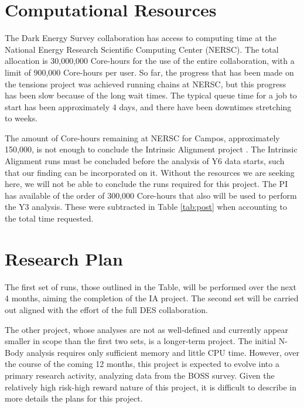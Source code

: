 \documentclass[12pt]{article}
\begin{document}
\begin{small}
\section{Computational Resources}

The Dark Energy Survey collaboration has access to computing time at the National Energy Research Scientific Computing Center (NERSC). The total allocation is 30,000,000 Core-hours for the use of the entire collaboration, with a  limit of 900,000 Core-hours per user. So far, the progress that has been made on the tensions project was achieved running chains at NERSC, but this progress has been slow because of the long wait times. The typical queue time for a job to start has been approximately 4 days, and there have been downtimes stretching to weeks. 

The amount of Core-hours remaining at NERSC for Campos, approximately 150,000, is not enough to conclude the Intrinsic Alignment project . The Intrinsic Alignment runs must be concluded before the analysis of Y6 data starts, such that our finding can be incorporated on it. Without the resources we are seeking here, we will not be able to conclude the runs required for this project. The PI has available of the order of 300,000 Core-hours that also will be used to perform the Y3 analysis. These were subtracted in Table \ref{tab:post} when accounting to the total time requested.




\section{Research Plan}


The first set of runs, those outlined in the Table, will be performed over the next 4 months, aiming the completion of the IA project. The second set will be carried out aligned with the effort of the full DES collaboration.

The other project, whose analyses are not as well-defined and currently appear smaller in scope than the first two sets, is a longer-term project. The initial N-Body analysis requires only sufficient memory and little CPU time. However, over the course of the coming 12 months, this project is expected to evolve into a primary research activity, analyzing data from the BOSS survey. Given the relatively high risk-high reward nature of this project, it is difficult to describe in more details the plans for this project.


\end{small}
\end{document}
